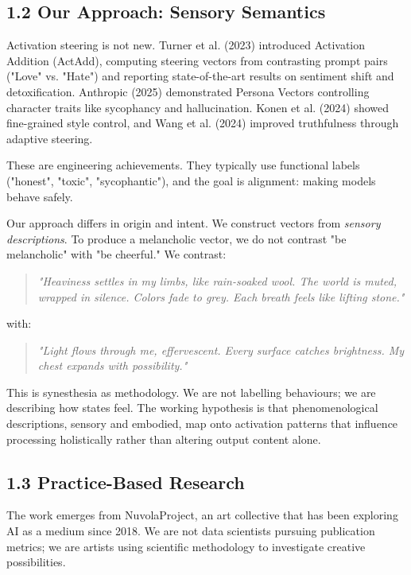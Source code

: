 \documentclass[11pt,a4paper]{article}
\begin{document}
\subsection*{1.2 Our Approach: Sensory Semantics}

Activation steering is not new. Turner et al. (2023) introduced Activation Addition (ActAdd), computing steering vectors from contrasting prompt pairs ("Love" vs. "Hate") and reporting state-of-the-art results on sentiment shift and detoxification. Anthropic (2025) demonstrated Persona Vectors controlling character traits like sycophancy and hallucination. Konen et al. (2024) showed fine-grained style control, and Wang et al. (2024) improved truthfulness through adaptive steering.

These are engineering achievements. They typically use functional labels ("honest", "toxic", "sycophantic"), and the goal is alignment: making models behave safely.

Our approach differs in origin and intent. We construct vectors from \emph{sensory descriptions}. To produce a melancholic vector, we do not contrast "be melancholic" with "be cheerful." We contrast:

\begin{quote}
\emph{"Heaviness settles in my limbs, like rain-soaked wool. The world is muted, wrapped in silence. Colors fade to grey. Each breath feels like lifting stone."}
\end{quote}

with:

\begin{quote}
\emph{"Light flows through me, effervescent. Every surface catches brightness. My chest expands with possibility."}
\end{quote}

This is synesthesia as methodology. We are not labelling behaviours; we are describing how states feel. The working hypothesis is that phenomenological descriptions, sensory and embodied, map onto activation patterns that influence processing holistically rather than altering output content alone.

\subsection*{1.3 Practice-Based Research}

The work emerges from NuvolaProject, an art collective that has been exploring AI as a medium since 2018. We are not data scientists pursuing publication metrics; we are artists using scientific methodology to investigate creative possibilities.
\end{document}
